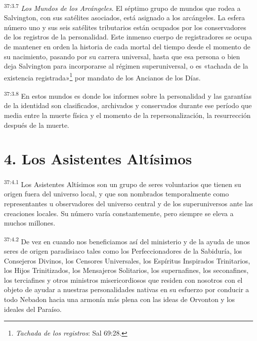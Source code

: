 \par
\textsuperscript{37:3.7} \textit{Los Mundos de los Arcángeles}. El séptimo grupo de mundos que rodea a Salvington, con sus satélites asociados, está asignado a los arcángeles. La esfera número uno y sus seis satélites tributarios están ocupados por los conservadores de los registros de la personalidad. Este inmenso cuerpo de registradores se ocupa de mantener en orden la historia de cada mortal del tiempo desde el momento de su nacimiento, pasando por su carrera universal, hasta que esa persona o bien deja Salvington para incorporarse al régimen superuniversal, o es «tachada de la existencia registrada»\footnote{\textit{Tachada de los registros}: Sal 69:28.} por mandato de los Ancianos de los Días.

\par
\textsuperscript{37:3.8} En estos mundos es donde los informes sobre la personalidad y las garantías de la identidad son clasificados, archivados y conservados durante ese período que media entre la muerte física y el momento de la repersonalización, la resurrección después de la muerte.

\section*{4. Los Asistentes Altísimos}
\par
\textsuperscript{37:4.1} Los Asistentes Altísimos son un grupo de seres voluntarios que tienen su origen fuera del universo local, y que son nombrados temporalmente como representantes u observadores del universo central y de los superuniversos ante las creaciones locales. Su número varía constantemente, pero siempre se eleva a muchos millones.

\par
\textsuperscript{37:4.2} De vez en cuando nos beneficiamos así del ministerio y de la ayuda de unos seres de origen paradisiaco tales como los Perfeccionadores de la Sabiduría, los Consejeros Divinos, los Censores Universales, los Espíritus Inspirados Trinitarios, los Hijos Trinitizados, los Mensajeros Solitarios, los supernafines, los seconafines, los terciafines y otros ministros misericordiosos que residen con nosotros con el objeto de ayudar a nuestras personalidades nativas en su esfuerzo por conducir a todo Nebadon hacia una armonía más plena con las ideas de Orvonton y los ideales del Paraíso.

